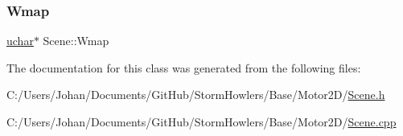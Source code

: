 \subsubsection{\texorpdfstring{Wmap}{Wmap}}
{\footnotesize\ttfamily \mbox{\hyperlink{_defs_8h_a65f85814a8290f9797005d3b28e7e5fc}{uchar}}$\ast$ Scene\+::\+Wmap}



The documentation for this class was generated from the following files\+:\begin{DoxyCompactItemize}
\item 
C\+:/\+Users/\+Johan/\+Documents/\+Git\+Hub/\+Storm\+Howlers/\+Base/\+Motor2\+D/\mbox{\hyperlink{_scene_8h}{Scene.\+h}}\item 
C\+:/\+Users/\+Johan/\+Documents/\+Git\+Hub/\+Storm\+Howlers/\+Base/\+Motor2\+D/\mbox{\hyperlink{_scene_8cpp}{Scene.\+cpp}}\end{DoxyCompactItemize}
